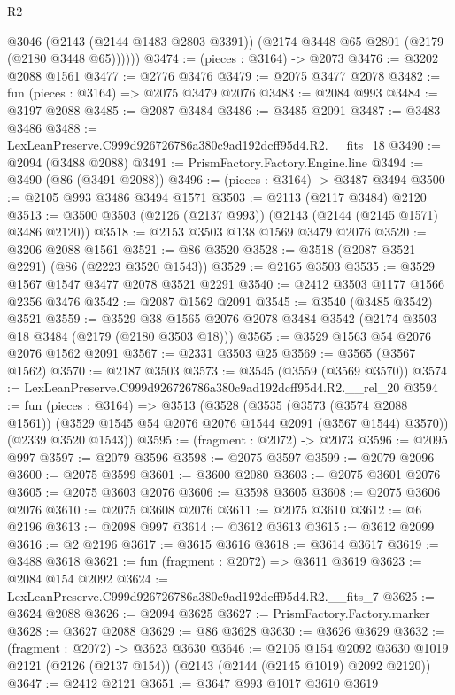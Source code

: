 \begin{lexlean}{R2}
\begin{coremodule}
          @3046
          (@2143 (@2144 @1483 @2803 @3391))
          (@2174 @3448 @65 @2801 (@2179 (@2180 @3448 @65))))))
@3474 := (pieces : @3164) -> @2073
@3476 := @3202 @2088 @1561
@3477 := @2776 @3476
@3479 := @2075 @3477 @2078
@3482 := fun (pieces : @3164) => @2075 @3479 @2076
@3483 := @2084 @993
@3484 := @3197 @2088
@3485 := @2087 @3484
@3486 := @3485 @2091
@3487 := @3483 @3486
@3488 := LexLeanPreserve.C999d926726786a380c9ad192dcff95d4.R2.__fits_18
@3490 := @2094 (@3488 @2088)
@3491 := PrismFactory.Factory.Engine.line
@3494 := @3490 (@86 (@3491 @2088))
@3496 := (pieces : @3164) -> @3487 @3494
@3500 := @2105 @993 @3486 @3494 @1571
@3503 := @2113 (@2117 @3484) @2120
@3513 := @3500 @3503 (@2126 (@2137 @993)) (@2143 (@2144 (@2145 @1571) @3486 @2120))
@3518 := @2153 @3503 @138 @1569 @3479 @2076
@3520 := @3206 @2088 @1561
@3521 := @86 @3520
@3528 := @3518 (@2087 @3521 @2291) (@86 (@2223 @3520 @1543))
@3529 := @2165 @3503
@3535 := @3529 @1567 @1547 @3477 @2078 @3521 @2291
@3540 := @2412 @3503 @1177 @1566 @2356 @3476
@3542 := @2087 @1562 @2091
@3545 := @3540 (@3485 @3542) @3521
@3559 := @3529 @38 @1565 @2076 @2078 @3484 @3542 (@2174 @3503 @18 @3484 (@2179 (@2180 @3503 @18)))
@3565 := @3529 @1563 @54 @2076 @2076 @1562 @2091
@3567 := @2331 @3503 @25
@3569 := @3565 (@3567 @1562)
@3570 := @2187 @3503
@3573 := @3545 (@3559 (@3569 @3570))
@3574 := LexLeanPreserve.C999d926726786a380c9ad192dcff95d4.R2.__rel_20
@3594 := fun (pieces : @3164) =>
  @3513
    (@3528
      (@3535
        (@3573 (@3574 @2088 @1561))
        (@3529 @1545 @54 @2076 @2076 @1544 @2091 (@3567 @1544) @3570))
      (@2339 @3520 @1543))
@3595 := (fragment : @2072) -> @2073
@3596 := @2095 @997
@3597 := @2079 @3596
@3598 := @2075 @3597
@3599 := @2079 @2096
@3600 := @2075 @3599
@3601 := @3600 @2080
@3603 := @2075 @3601 @2076
@3605 := @2075 @3603 @2076
@3606 := @3598 @3605
@3608 := @2075 @3606 @2076
@3610 := @2075 @3608 @2076
@3611 := @2075 @3610
@3612 := @6 @2196
@3613 := @2098 @997
@3614 := @3612 @3613
@3615 := @3612 @2099
@3616 := @2 @2196
@3617 := @3615 @3616
@3618 := @3614 @3617
@3619 := @3488 @3618
@3621 := fun (fragment : @2072) => @3611 @3619
@3623 := @2084 @154 @2092
@3624 := LexLeanPreserve.C999d926726786a380c9ad192dcff95d4.R2.__fits_7
@3625 := @3624 @2088
@3626 := @2094 @3625
@3627 := PrismFactory.Factory.marker
@3628 := @3627 @2088
@3629 := @86 @3628
@3630 := @3626 @3629
@3632 := (fragment : @2072) -> @3623 @3630
@3646 := @2105
    @154
    @2092
    @3630
    @1019
    @2121
    (@2126 (@2137 @154))
    (@2143 (@2144 (@2145 @1019) @2092 @2120))
@3647 := @2412 @2121
@3651 := @3647 @993 @1017 @3610 @3619

\end{coremodule}
\end{lexlean}
